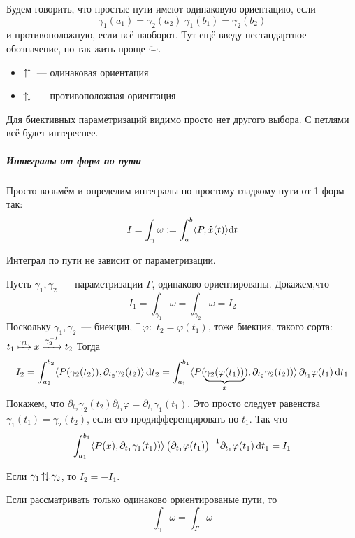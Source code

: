 \documentclass[12pt,timbord]{../../../notes}
\begin{document}
\begin{defn}\label{defn:lineint::defs::pathorient}
  Будем говорить, что простые пути имеют одинаковую ориентацию, если
  \[
    \gamma_1(a_1)=\gamma_2(a_2)\; \gamma_1(b_1) = \gamma_2(b_2)
  \]
  и противоположную, если всё наоборот.
  Тут ещё введу нестандартное обозначение, но так жить проще $\ddot\smile$.
  \begin{itemize}
    \item $\mathop{\uparrow\!\uparrow}$~--- одинаковая ориентация
    \item $\mathop{\uparrow\!\downarrow}$~--- противоположная ориентация
  \end{itemize}
\end{defn}
\begin{rem*}
  Для биективных параметризаций видимо просто нет другого выбора. С петлями всё будет интереснее.
\end{rem*}

\subparagraph{Интегралы от форм по пути}

\begin{defn}\label{defn:lineint::defs::lineint}
  Просто возьмём и определим интегралы по простому гладкому пути от 1-форм так:
  \[
    I = \int_\gamma \omega := \int_a^b \langle P,\accentset{\mbox{\bfseries .}}{x}(t)\rangle \mathrm{d} t
  \]
\end{defn}

\begin{prop}\label{prop:lineint::defs::lineint}
  Интеграл по пути не зависит от параметризации.
\end{prop}
\begin{ittproof}
  Пусть $\gamma_1, \gamma_2$~--- параметризации $\Gamma$, одинаково ориентированы. Докажем,что
  \[
    I_1 = \int_{\gamma_1} \omega = \int_{\gamma_2} \omega = I_2 
  \]
  Поскольку $\gamma_1, \gamma_2$~--- биекции, $\exists\, \varphi \colon $
  $t_2 = \varphi(t_1)$, тоже биекция, такого сорта:
   $t_1\xmapsto{\gamma_1}x\xmapsto{\gamma_2^{-1}}t_2$
  Тогда 
  \[
    I_2  = \int_{a_2}^{b_2} \langle P(\gamma_2(t_2)), \partial_{t_2}\gamma_2(t_2)\rangle \,\mathrm{d} t_2 = 
    \int_{a_1}^{b_1} \langle P(\underbrace{\gamma_2(\varphi(t_1))}_x), 
  \partial_{t_2}\gamma_2(t_2))\rangle \, \partial_{t_1}\varphi(t_1) \,\mathrm{d} t_1
  \]
  Покажем, что $\partial_{t_2}\gamma_2(t_2) \partial_{t_1}\varphi = \partial_{t_1}
  \gamma_1(t_1)$. Это просто следует равенства $\gamma_1(t_1)=\gamma_2(t_2)$, если его
  продифференцировать по $t_1$. Так что
  \[
    \int_{a_1}^{b_1} \langle P(x), 
  \partial_{t_1}\gamma_1(t_1))\rangle \, \bigl(\partial_{t_1}\varphi(t_1) \bigr)^{-1}
  \partial_{t_1}\varphi(t_1) \,\mathrm{d} t_1   = I_1
  \]
\end{ittproof}
\begin{rem}
  Если $\gamma_1 \mathop{\uparrow\!\downarrow} \gamma_2$, то $I_2 = - I_1$.
\end{rem}
\begin{rem}
  Если рассматривать только одинаково ориентированые пути, то
  \[
    \int_{\gamma} \omega = \int_{\Gamma} \omega
  \]
\end{rem}
\end{document}

